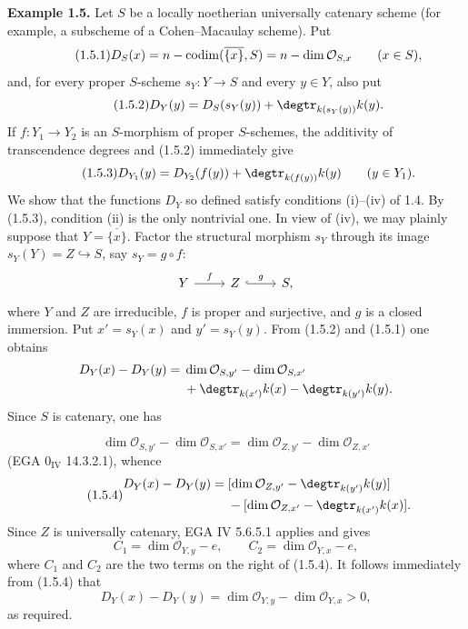 \textbf{Example 1.5.}
Let $S$ be a locally noetherian universally catenary scheme (for example, a
subscheme of a Cohen--Macaulay scheme). Put
\begin{equation}\tag{1.5.1}
D_S(x)=n-\operatorname{codim}(\overline{\{x\}},S)
      =n-\dim\mathcal O_{S,x}\qquad(x\in S),
\end{equation}
and, for every proper $S$-scheme $s_Y:Y\to S$ and every $y\in Y$, also put
\begin{equation}\tag{1.5.2}
D_Y(y)=D_S(s_Y(y))+\degtr_{k(s_Y(y))}k(y).
\end{equation}
If $f:Y_1\to Y_2$ is an $S$-morphism of proper $S$-schemes, the additivity of
transcendence degrees and (1.5.2) immediately give
\begin{equation}\tag{1.5.3}
D_{Y_1}(y)=D_{Y_2}(f(y))+\degtr_{k(f(y))}k(y)
\qquad(y\in Y_1).
\end{equation}
We show that the functions $D_Y$ so defined satisfy conditions (i)--(iv) of
1.4. By (1.5.3), condition (ii) is the only nontrivial one. In view of (iv),
we may plainly suppose that $Y=\overline{\{x\}}$. Factor the structural
morphism $s_Y$ through its image $s_Y(Y)=Z\hookrightarrow S$, say
$s_Y=g\circ f$:
\[
\begin{tikzcd}
Y \arrow[r,"f"] & Z \arrow[r,hook,"g"] & S,
\end{tikzcd}
\]
where $Y$ and $Z$ are irreducible, $f$ is proper and surjective, and $g$ is a
closed immersion. Put $x'=s_Y(x)$ and $y'=s_Y(y)$. From (1.5.2) and (1.5.1)
one obtains
\[
\begin{split}
D_Y(x)-D_Y(y)={}&\dim\mathcal O_{S,y'}-\dim\mathcal O_{S,x'}\\
&+\degtr_{k(x')}k(x)-\degtr_{k(y')}k(y).
\end{split}
\]
Since $S$ is catenary, one has

\[
\dim\mathcal O_{S,y'}-\dim\mathcal O_{S,x'}
=\dim\mathcal O_{Z,y'}-\dim\mathcal O_{Z,x'}
\]
(EGA $0_{\mathrm{IV}}$ 14.3.2.1), whence
\begin{equation}\tag{1.5.4}
\begin{split}
D_Y(x)-D_Y(y)={}&
[\dim\mathcal O_{Z,y'}-\degtr_{k(y')}k(y)]\\
&-[\dim\mathcal O_{Z,x'}-\degtr_{k(x')}k(x)].
\end{split}
\end{equation}
Since $Z$ is universally catenary, EGA IV 5.6.5.1 applies and gives
\[
C_1=\dim\mathcal O_{Y,y}-e,
\qquad
C_2=\dim\mathcal O_{Y,x}-e,
\]
where $C_1$ and $C_2$ are the two terms on the right of (1.5.4). It follows
immediately from (1.5.4) that
\[
D_Y(x)-D_Y(y)
=\dim\mathcal O_{Y,y}-\dim\mathcal O_{Y,x}>0,
\]
as required.


